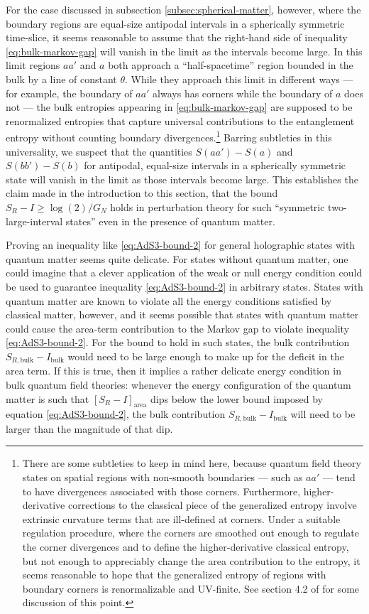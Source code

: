\documentclass[a4paper,11pt]{article}
\begin{document}
For the case discussed in subsection \ref{subsec:spherical-matter}, however, where the boundary regions are equal-size antipodal intervals in a spherically symmetric time-slice, it seems reasonable to assume that the right-hand side of inequality \eqref{eq:bulk-markov-gap} will vanish in the limit as the intervals become large. In this limit regions $aa'$ and $a$ both approach a ``half-spacetime'' region bounded in the bulk by a line of constant $\theta$. While they approach this limit in different ways --- for example, the boundary of $aa'$ always has corners while the boundary of $a$ does not --- the bulk entropies appearing in \eqref{eq:bulk-markov-gap} are supposed to be renormalized entropies that capture universal contributions to the entanglement entropy without counting boundary divergences.\footnote{There are some subtleties to keep in mind here, because quantum field theory states on spatial regions with non-smooth boundaries --- such as $aa'$ --- tend to have divergences associated with those corners. Furthermore, higher-derivative corrections to the classical piece of the generalized entropy involve extrinsic curvature terms that are ill-defined at corners. Under a suitable regulation procedure, where the corners are smoothed out enough to regulate the corner divergences and to define the higher-derivative classical entropy, but not enough to appreciably change the area contribution to the entropy, it seems reasonable to hope that the generalized entropy of regions with boundary corners is renormalizable and UV-finite. See section 4.2 of \cite{quantum-maximin} for some discussion of this point.} Barring subtleties in this universality, we suspect that the quantities $S(aa') - S(a)$ and $S(bb') - S(b)$ for antipodal, equal-size intervals in a spherically symmetric state will vanish in the limit as those intervals become large. This establishes the claim made in the introduction to this section, that the bound $S_R - I \geq \log(2) / G_N$ holds in perturbation theory for such ``symmetric two-large-interval states'' even in the presence of quantum matter.

Proving an inequality like \eqref{eq:AdS3-bound-2} for general holographic states with quantum matter seems quite delicate. For states without quantum matter, one could imagine that a clever application of the weak or null energy condition could be used to guarantee inequality \eqref{eq:AdS3-bound-2} in arbitrary states. States with quantum matter are known to violate all the energy conditions satisfied by classical matter, however, and it seems possible that states with quantum matter could cause the area-term contribution to the Markov gap to violate inequality \eqref{eq:AdS3-bound-2}. For the bound to hold in such states, the bulk contribution $S_{R, \text{bulk}} - I_{\text{bulk}}$ would need to be large enough to make up for the deficit in the area term. If this is true, then it implies a rather delicate energy condition in bulk quantum field theories: whenever the energy configuration of the quantum matter is such that $[S_R - I]_{\text{area}}$ dips below the lower bound imposed by equation \eqref{eq:AdS3-bound-2}, the bulk contribution $S_{R, \text{bulk}} - I_{\text{bulk}}$ will need to be larger than the magnitude of that dip.
\end{document}

